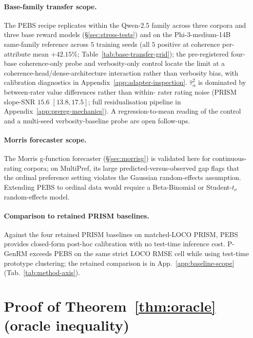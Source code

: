 \documentclass{article}
\begin{document}
\paragraph{Base-family transfer scope.} The PEBS recipe
replicates within the Qwen-2.5 family across three corpora and
three base reward models (\S\ref{sec:stress-tests}) and on the
Phi-3-medium-14B same-family reference across $5$ training seeds
(all $5$ positive at coherence per-attribute mean $+42.15\%$;
Table~\ref{tab:base-transfer-grid}); the pre-registered four-base
coherence-only probe and verbosity-only control locate the
limit at a coherence-head/dense-architecture interaction rather
than verbosity bias, with calibration diagnostics in
Appendix~\ref{app:adapter-inspection}. $\hat\tau^2_\alpha$ is
dominated by between-rater value differences rather than within-
rater rating noise (PRISM slope-SNR $15.6$ $[13.8, 17.5]$;
full residualisation pipeline in
Appendix~\ref{app:prereg-mechanics}). A regression-to-mean reading
of the control and a multi-seed verbosity-baseline probe
are open follow-ups.

\paragraph{Morris forecaster scope.} The Morris g-function
forecaster (\S\ref{sec:morrisg}) is validated here for
continuous-rating corpora; on MultiPref, its large
predicted-versus-observed gap flags that the ordinal preference
setting violates the Gaussian random-effects
assumption. Extending PEBS to ordinal data would require a
Beta-Binomial or Student-$t_\nu$ random-effects model.

\paragraph{Comparison to retained PRISM baselines.}
Against the four retained PRISM baselines on matched-LOCO
PRISM, PEBS provides closed-form post-hoc calibration with no
test-time inference cost. P-GenRM exceeds PEBS on the same strict
LOCO RMSE cell while using test-time prototype clustering; the
retained comparison is in App.~\ref{app:baseline-scope}
(Tab.~\ref{tab:method-axis}).

{\footnotesize


}

\onecolumn
\appendix

\section{Proof of Theorem~\ref{thm:oracle} (oracle inequality)}
\label{app:proof-oracle}
\end{document}

